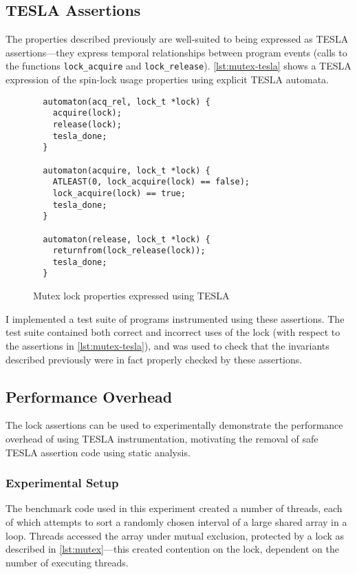 \subsection{TESLA Assertions} \label{sec:lock-assertions}

The properties described previously are well-suited to being expressed as TESLA
assertions---they express temporal relationships between program events (calls
to the functions \texttt{lock_acquire} and \texttt{lock_release}).
\autoref{lst:mutex-tesla} shows a TESLA expression of the spin-lock usage
properties using explicit TESLA automata.
\begin{figure}
  \begin{verbatim}
  automaton(acq_rel, lock_t *lock) {
    acquire(lock);
    release(lock);
    tesla_done;
  }

  automaton(acquire, lock_t *lock) {
    ATLEAST(0, lock_acquire(lock) == false);
    lock_acquire(lock) == true;
    tesla_done;
  }

  automaton(release, lock_t *lock) {
    returnfrom(lock_release(lock));
    tesla_done;
  }
  \end{verbatim}
  \caption{Mutex lock properties expressed using TESLA}
  \label{lst:mutex-tesla}
\end{figure}

I implemented a test suite of programs instrumented using these assertions. The
test suite contained both correct and incorrect uses of the lock (with respect
to the assertions in \autoref{lst:mutex-tesla}), and was used to check that the
invariants described previously were in fact properly checked by these
assertions.

\subsection{Performance Overhead}

The lock assertions can be used to experimentally demonstrate the performance
overhead of using TESLA instrumentation, motivating the removal of safe TESLA
assertion code using static analysis.

\subsubsection{Experimental Setup}

The benchmark code used in this experiment created a number of threads, each of
which attempts to sort a randomly chosen interval of a large shared array in a
loop. Threads accessed the array under mutual exclusion, protected by a lock as
described in \autoref{lst:mutex}---this created contention on the lock,
dependent on the number of executing threads.

